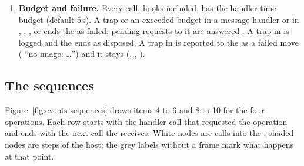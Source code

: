 \begin{enumerate}[leftmargin=2em]
  before ; the first calls are then
  , the timeout replies,  (when
  requested), and the rest of the mailbox ().
\item \textbf{Budget and failure.} Every call, hooks included, has the
  handler time budget (default 5\,s). A trap or an exceeded budget in a
  message handler or in , ,
  ,  or  ends the
  \paglet{} as failed; pending requests to it are answered . A
  trap in  is logged and the \paglet{} ends as disposed.
  A trap in  is reported to the \paglet{} as a failed
  move ( ``no image: \ldots'') and it stays
  (, , ).
\end{enumerate}

\subsection{The sequences}\label{sec:events-sequences}

Figure~\ref{fig:events-sequences} draws items 4 to 6 and 8 to 10 for the
four operations. Each row starts with the handler call that requested the
operation and ends with the next call the \paglet{} receives. White nodes
are calls into the \paglet{}; shaded nodes are steps of the host; the grey
labels without a frame mark what happens at that point.

